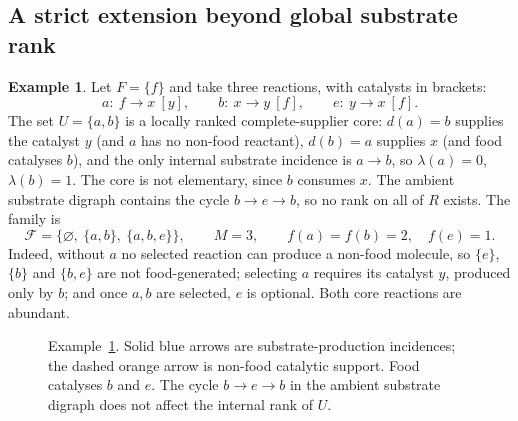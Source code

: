 \documentclass[11pt,a4paper]{article}
\theoremstyle{plain}
\theoremstyle{definition}
\newtheorem{example}[theorem]{Example}
\theoremstyle{remark}
\newcommand{\FF}{\mathcal F}
\begin{document}
\subsection{A strict extension beyond global substrate rank}\label{sec:strict}

\begin{example}\label{ex:strict}
Let $F=\{f\}$ and take three reactions, with catalysts in brackets:
\[
 a:\ f\longrightarrow x\ [y],\qquad b:\ x\longrightarrow y\ [f],\qquad e:\ y\longrightarrow x\ [f].
\]
The set $U=\{a,b\}$ is a locally ranked complete-supplier core: $d(a)=b$ supplies the catalyst $y$ (and $a$ has no non-food reactant), $d(b)=a$ supplies $x$ (and food catalyses $b$), and the only internal substrate incidence is $a\to b$, so $\lambda(a)=0$, $\lambda(b)=1$. The core is not elementary, since $b$ consumes $x$. The ambient substrate digraph contains the cycle $b\to e\to b$, so no rank on all of $R$ exists. The family is
\begin{equation}\label{eq:strict}
 \FF=\bigl\{\varnothing,\ \{a,b\},\ \{a,b,e\}\bigr\},\qquad M=3,\qquad f(a)=f(b)=2,\quad f(e)=1 .
\end{equation}
Indeed, without $a$ no selected reaction can produce a non-food molecule, so $\{e\}$, $\{b\}$ and $\{b,e\}$ are not food-generated; selecting $a$ requires its catalyst $y$, produced only by $b$; and once $a,b$ are selected, $e$ is optional. Both core reactions are abundant.
\end{example}

\begin{figure}[htbp]
\centering
{}
\caption{Example~\ref{ex:strict}. Solid blue arrows are substrate-production incidences; the dashed orange arrow is non-food catalytic support. Food catalyses $b$ and $e$. The cycle $b\to e\to b$ in the ambient substrate digraph does not affect the internal rank of $U$.}
\label{fig:strict}
\end{figure}
\end{document}

